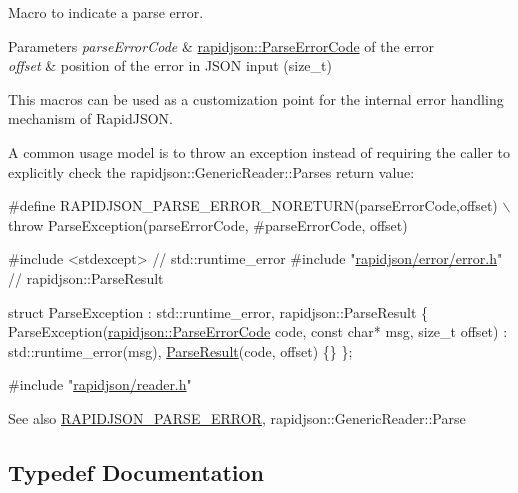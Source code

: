 Macro to indicate a parse error. 


\begin{DoxyParams}{Parameters}
{\em parse\+Error\+Code} & \hyperlink{group___r_a_p_i_d_j_s_o_n___e_r_r_o_r_s_ga8d4b32dfc45840bca189ade2bbcb6ba7}{rapidjson\+::\+Parse\+Error\+Code} of the error \\
\hline
{\em offset} & position of the error in J\+S\+ON input ({\ttfamily size\+\_\+t})\\
\hline
\end{DoxyParams}
This macros can be used as a customization point for the internal error handling mechanism of Rapid\+J\+S\+ON.

A common usage model is to throw an exception instead of requiring the caller to explicitly check the rapidjson\+::\+Generic\+Reader\+::\+Parse\textquotesingle{}s return value\+:


\begin{DoxyCode}
\textcolor{preprocessor}{#define RAPIDJSON\_PARSE\_ERROR\_NORETURN(parseErrorCode,offset) \(\backslash\)}
\textcolor{preprocessor}{   throw ParseException(parseErrorCode, #parseErrorCode, offset)}

\textcolor{preprocessor}{#include <stdexcept>}               \textcolor{comment}{// std::runtime\_error}
\textcolor{preprocessor}{#include "\hyperlink{error_8h}{rapidjson/error/error.h}"} \textcolor{comment}{// rapidjson::ParseResult}

\textcolor{keyword}{struct }ParseException : std::runtime\_error, rapidjson::ParseResult \{
  ParseException(\hyperlink{group___r_a_p_i_d_j_s_o_n___e_r_r_o_r_s_ga8d4b32dfc45840bca189ade2bbcb6ba7}{rapidjson::ParseErrorCode} code, \textcolor{keyword}{const} \textcolor{keywordtype}{char}* msg, \textcolor{keywordtype}{size\_t} offset)
    : std::runtime\_error(msg), \hyperlink{struct_parse_result}{ParseResult}(code, offset) \{\}
\};

\textcolor{preprocessor}{#include "\hyperlink{reader_8h}{rapidjson/reader.h}"}
\end{DoxyCode}


\begin{DoxySeeAlso}{See also}
\hyperlink{group___r_a_p_i_d_j_s_o_n___e_r_r_o_r_s_gae3689840fa6e89a241313f33b602f865}{R\+A\+P\+I\+D\+J\+S\+O\+N\+\_\+\+P\+A\+R\+S\+E\+\_\+\+E\+R\+R\+OR}, rapidjson\+::\+Generic\+Reader\+::\+Parse 
\end{DoxySeeAlso}


\subsection{Typedef Documentation}
\mbox{\label{group___r_a_p_i_d_j_s_o_n___e_r_r_o_r_s_ga586548166441ab3ce30219cb35be2e04}} 

